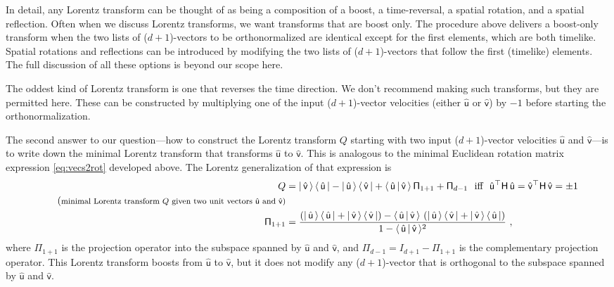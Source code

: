 \documentclass{article}
\newcommand{\metric}{\mathsf{H}}
\newcommand{\proj}{\mathsf{\Pi}}
\newcommand{\Lhat}[1]{\hat{\mathsf{#1}}} %
\newcommand{\braket}[2]{\langle\,{#1}\,|\,{#2}\,\rangle}
\newcommand{\ketbra}[2]{|\,{#1}\,\rangle\,\langle\,{#2}\,|}
\newcommand{\plus}{\!+\!} %
\begin{document}
In detail, any Lorentz transform can be thought of as being a composition of a boost, a time-reversal, a spatial rotation, and a spatial reflection.
Often when we discuss Lorentz transforms, we want transforms that are boost only.
The procedure above delivers a boost-only transform when the two lists of ($d\plus1$)-vectors to be orthonormalized are identical except for the first elements, which are both timelike.
Spatial rotations and reflections can be introduced by modifying the two lists of ($d\plus1$)-vectors that follow the first (timelike) elements.
The full discussion of all these options is beyond our scope here.

The oddest kind of Lorentz transform is one that reverses the time direction.
We don't recommend making such transforms, but they are permitted here.
These can be constructed by multiplying one of the input ($d\plus1$)-vector velocities (either $\Lhat{u}$ or $\Lhat{v}$) by $-1$ before starting the orthonormalization.

The second answer to our question---how to construct the Lorentz transform $Q$ starting with two input ($d\plus1$)-vector velocities $\Lhat{u}$ and $\Lhat{v}$---is to write down the minimal Lorentz transform that transforms $\Lhat{u}$ to $\Lhat{v}$.
This is analogous to the minimal Euclidean rotation matrix expression \eqref{eq:vecs2rot} developed above.
The Lorentz generalization of that expression is
\begin{align}
    Q &= \ketbra{\Lhat{v}}{\Lhat{u}} - \ketbra{\Lhat{u}}{\Lhat{v}} + \braket{\Lhat{u}}{\Lhat{v}}\,\proj_{1+1} + \proj_{d-1} ~~ \mbox{iff} ~~ \Lhat{u}^\top\metric\,\Lhat{u} = \Lhat{v}^\top\metric\,\Lhat{v} = \pm 1 \label{eq:vecs2LT} \\
    \tag{\footnotesize minimal Lorentz transform $Q$ given two unit vectors $\Lhat{u}$ and $\Lhat{v}$} \\
    \proj_{1+1} &= \frac{\left(\ketbra{\Lhat{u}}{\Lhat{u}} + \ketbra{\Lhat{v}}{\Lhat{v}}\right) - \braket{\Lhat{u}}{\Lhat{v}}\,\left(\ketbra{\Lhat{u}}{\Lhat{v}} + \ketbra{\Lhat{v}}{\Lhat{u}}\right)}{1 - \braket{\Lhat{u}}{\Lhat{v}}^2} ~,
\end{align}
where $\proj_{1+1}$ is the projection operator into the subspace spanned by $\Lhat{u}$ and $\Lhat{v}$,
and $\proj_{d-1} = I_{d+1} - \proj_{1+1}$ is the complementary projection operator.
This Lorentz transform boosts from $\Lhat{u}$ to $\Lhat{v}$, but it does not modify any ($d\plus1$)-vector that is orthogonal to the subspace spanned by $\Lhat{u}$ and $\Lhat{v}$.
\end{document}

